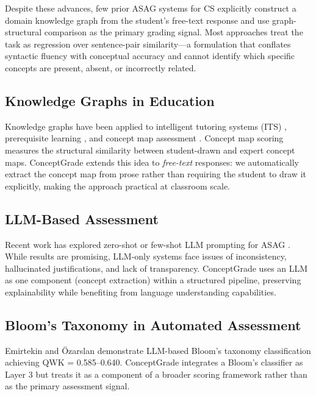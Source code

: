 \documentclass[conference]{IEEEtran}
\begin{document}
Despite these advances, few prior ASAG systems for CS explicitly
construct a domain knowledge graph from the student's free-text response and
use graph-structural comparison as the primary grading signal. Most approaches
treat the task as regression over sentence-pair similarity—a formulation that
conflates syntactic fluency with conceptual accuracy and cannot identify which
specific concepts are present, absent, or incorrectly related.

\subsection{Knowledge Graphs in Education}

Knowledge graphs have been applied to intelligent tutoring systems (ITS)
\cite{kg_its}, prerequisite learning \cite{kg_prereq}, and concept map assessment
\cite{concept_map}. Concept map scoring measures the structural similarity between
student-drawn and expert concept maps. ConceptGrade extends this idea to
\emph{free-text} responses: we automatically extract the concept map from prose
rather than requiring the student to draw it explicitly, making the approach
practical at classroom scale.

\subsection{LLM-Based Assessment}

Recent work has explored zero-shot or few-shot LLM prompting for ASAG
\cite{llm_asag1,llm_asag2}. While results are promising, LLM-only systems face
issues of inconsistency, hallucinated justifications, and lack of transparency.
ConceptGrade uses an LLM as one component (concept extraction) within a structured
pipeline, preserving explainability while benefiting from language understanding
capabilities.

\subsection{Bloom's Taxonomy in Automated Assessment}

Emirtekin and Özarslan \cite{emirtekin2025} demonstrate LLM-based Bloom's taxonomy
classification achieving QWK = 0.585–0.640. ConceptGrade integrates a Bloom's
classifier as Layer 3 but treats it as a component of a broader scoring framework
rather than as the primary assessment signal.

\end{document}
